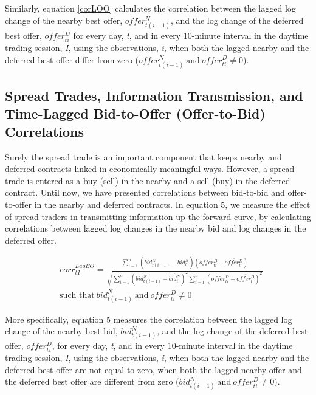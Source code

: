 \documentclass[review,12pt]{elsarticle}
\begin{document}
\begin{linenumbers}
Similarly, equation \ref{corLOO} calculates the correlation between the
lagged log change of the nearby best offer, \(offer_{t(i-1)}^N\), and
the log change of the deferred best offer, \(offer_{ti}^D\) for every
day, \emph{t}, and in every 10-minute interval in the daytime trading
session, \emph{I}, using the observations, \emph{i}, when both the
lagged nearby and the deferred best offer differ from zero
(\({offer_{t(i-1)}^N \: \textrm{and} \: offer_{ti}^D} \neq 0\)).

\subsection{Spread Trades, Information Transmission, and Time-Lagged
Bid-to-Offer (Offer-to-Bid)
Correlations}\label{spread-trades-information-transmission-and-time-lagged-bid-to-offer-offer-to-bid-correlations}

Surely the spread trade is an important component that keeps nearby and
deferred contracts linked in economically meaningful ways. However, a
spread trade is entered as a buy (sell) in the nearby and a sell (buy)
in the deferred contract. Until now, we have presented correlations
between bid-to-bid and offer-to-offer in the nearby and deferred
contracts. In equation 5, we measure the effect of spread traders in
transmitting information up the forward curve, by calculating
correlations between lagged log changes in the nearby bid and log
changes in the deferred offer.

\begin{equation} \label{corrLBO}
\begin{split}
& corr^{LagBO}_{tI} = \frac{\sum\limits_{i=1}^{n} \left(bid_{t(i-1)}^N - \overline{bid_t^N}\right) \left(offer_{ti}^D - \overline{offer_t^D}\right)}{\sqrt{\sum\limits_{i=1}^{n} \left(bid_{t(i-1)}^N - \overline{bid_t^N}\right)^2 \sum\limits_{i=1}^{n}\left(offer_{ti}^D - \overline{offer_t^D}\right)^2}} \\
& \textrm{such that} \: {bid_{t(i-1)}^N \: \textrm{and} \: offer_{ti}^D} \neq 0
\end{split}
\end{equation}

More specifically, equation 5 measures the correlation between the
lagged log change of the nearby best bid, \(bid_{t(i-1)}^N\), and the
log change of the deferred best offer, \(offer_{ti}^D\), for every day,
\emph{t}, and in every 10-minute interval in the daytime trading
session, \emph{I}, using the observations, \emph{i}, when both the
lagged nearby and the deferred best offer are not equal to zero, when
both the lagged nearby offer and the deferred best offer are different
from zero (\({bid_{t(i-1)}^N \: \textrm{and} \: offer_{ti}^D} \neq 0\)).


\end{linenumbers}
\end{document}
